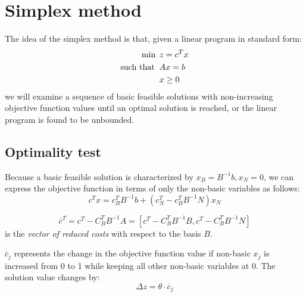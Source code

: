 \section{Simplex method}

The idea of the simplex method is that, given a linear program in standard form: 
\begin{align*}
    \min                      \:&\: z=c^Tx              \\
    \textnormal{such that }     &\: Ax=b                \\
                                &\: x \geq 0
\end{align*}
we will examine a sequence of basic feasible solutions with non-increasing objective function values until an optimal solution is reached, or the  linear program is 
found to be unbounded. 

\subsection*{Optimality test}
Because a basic feasible solution is characterized by $x_B=B^{-1}b,x_N=0$, we can express the objective function in terms of only the non-basic variables as follows:
\[c^Tx=c_B^TB^{-1}b+\left(c_N^T-c_B^TB^{-1}N\right)x_N\]
\newpage
\begin{definition}
    \[\overline{c}^T=c^T-C_B^TB^{-1}A=\left[c^T-C_B^TB^{-1}B,c^T-C_B^TB^{-1}N\right]\]
    is the \emph{vector of reduced costs} with respect to the basis $B$. 
\end{definition}
$\overline{c}_j$ represents the change in the objective function value if non-basic $x_j$ is increased from 0 to 1 while keeping all other non-basic variables at 0. 
The solution value changes by:
\[\Delta z=\theta \cdot \overline{c}_j\]

